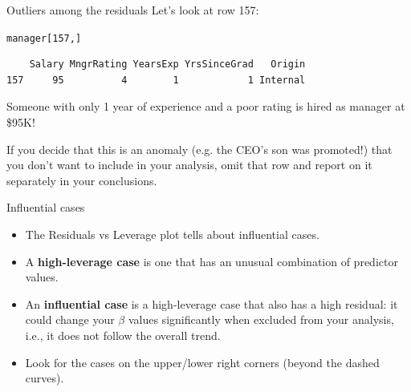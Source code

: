 \documentclass{beamer}\usepackage[]{graphicx}\usepackage[]{color}
\makeatletter
\newcommand{\hlnum}[1]{\textcolor[rgb]{0.824,0.412,0.118}{#1}}%
\newcommand{\hlopt}[1]{\textcolor[rgb]{1,0.894,0.769}{#1}}%
\newcommand{\hlstd}[1]{\textcolor[rgb]{1,0.894,0.769}{#1}}%
\newcommand{\hlkwd}[1]{\textcolor[rgb]{1,0.78,0.769}{#1}}%
\newenvironment{kframe}{%
 \def\at@end@of@kframe{}%
 \ifinner\ifhmode%
  \def\at@end@of@kframe{\end{minipage}}%
  \begin{minipage}{\columnwidth}%
 \fi\fi%
 \def\FrameCommand##1{\hskip\@totalleftmargin \hskip-\fboxsep
 \colorbox{shadecolor}{##1}\hskip-\fboxsep
     \hskip-\linewidth \hskip-\@totalleftmargin \hskip\columnwidth}%
 \MakeFramed {\advance\hsize-\width
   \@totalleftmargin\z@ \linewidth\hsize
   \@setminipage}}%
 {\par\unskip\endMakeFramed%
 \at@end@of@kframe}
\newenvironment{knitrout}{}{} %
\makeatother
\begin{document}
\begin{darkframes}
    
    
    
    \begin{frame}[fragile]{Outliers among the residuals}  
      Let's look at row 157:
\begin{knitrout}
\begin{kframe}
\begin{alltt}
\hlstd{manager[}\hlnum{157}\hlstd{,]}
\end{alltt}
\begin{verbatim}
    Salary MngrRating YearsExp YrsSinceGrad   Origin
157     95          4        1            1 Internal
\end{verbatim}
\end{kframe}
\end{knitrout}
      Someone with only 1 year of experience and a poor rating is hired as manager at \$95K! \pause \bigskip
      
      If you decide that this is an anomaly (e.g. the CEO's son was promoted!) that you don't want to include in your analysis, omit that row and report on it separately in your conclusions.
    \end{frame}
    
    
    \begin{frame}[fragile]{Influential cases}  
      \begin{itemize}[<+->]
        \item The Residuals vs Leverage plot tells about \alert{influential cases}.
        \item A \textbf{high-leverage case} is one that has an unusual combination of predictor values. 
        \item An \textbf{influential case} is a high-leverage case that also has a high residual: it could change your $\beta$ values significantly when excluded from your analysis, i.e., it does not follow the overall trend. 
        \item Look for the cases on the upper/lower right corners (beyond the dashed curves).
      \end{itemize}
    \end{frame}
    

  \end{darkframes}

  
\end{document}
